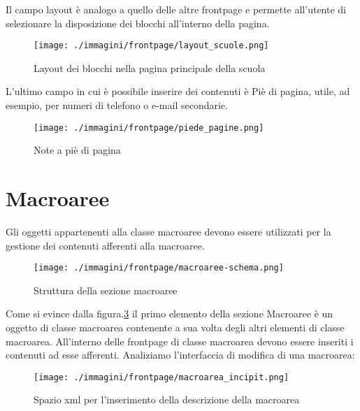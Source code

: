 Il campo layout è analogo a quello delle altre frontpage e permette all'utente di selezionare la disposizione dei blocchi all'interno della pagina.
\begin{figure}[H]
 \centering
 \texttt{[image: ./immagini/frontpage/layout\_scuole.png]}
 \caption{Layout dei blocchi nella pagina principale della scuola}
 \label{fig:scuole_layout}
\end{figure}


L'ultimo campo in cui è possibile inserire dei contenuti è Piè di pagina, utile, ad esempio, per numeri di telefono o e-mail secondarie.

\begin{figure}[H]
 \centering
 \texttt{[image: ./immagini/frontpage/piede\_pagine.png]}
 \caption{Note a piè di pagina}
 \label{fig:scuole_piedepagine}
\end{figure}



\section{Macroaree}

Gli oggetti appartenenti alla classe macroaree devono essere utilizzati per la gestione dei contenuti afferenti alla macroaree. 
\begin{figure}[H]
 \centering
 \texttt{[image: ./immagini/frontpage/macroaree-schema.png]}
 \caption{Struttura della sezione macroaree}
 \label{fig:macroaree_schema}
\end{figure}

Come si evince dalla figura.\ref{fig:macroaree_schema} il primo elemento della sezione Macroaree è un oggetto di classe macroarea contenente a sua volta degli altri elementi di classe macroarea. All'interno delle frontpage di classe macroarea devono essere inseriti i contenuti ad esse afferenti.
Analiziamo l'interfaccia di modifica di una macroarea:
\begin{figure}[H]
 \centering
 \texttt{[image: ./immagini/frontpage/macroarea\_incipit.png]}
 \caption{Spazio xml per l'inserimento della descrizione della macroarea}
 \label{fig:macroarea_incipit}
\end{figure}

